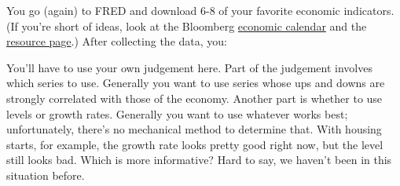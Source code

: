 \documentclass[12pt]{exam}
\begin{document}
\begin{questions}
You go (again) to FRED
and download 6-8 of your favorite economic indicators.
(If you're short of ideas, look at the Bloomberg
\href{http://www.bloomberg.com/markets/economic-calendar/}{economic calendar}
and the
\href{http://pages.stern.nyu.edu/~dbackus/macro_resources.htm}{resource page}.)
After collecting the data, you:
%

\begin{solution}
\begin{parts}
\item You'll have to use your own judgement here.
Part of the judgement involves which series to use.
Generally you want to use series whose ups and downs
are strongly correlated with those of the economy.
Another part is whether to use levels or growth rates.
Generally you want to use whatever works best;
unfortunately, there's no mechanical method to determine that.
With housing starts, for example, the growth rate looks pretty good right now,
but the level still looks bad.
Which is more informative?  Hard to say, we haven't been in this situation before.


\end{parts}
\end{solution}
\end{questions}
\end{document}
